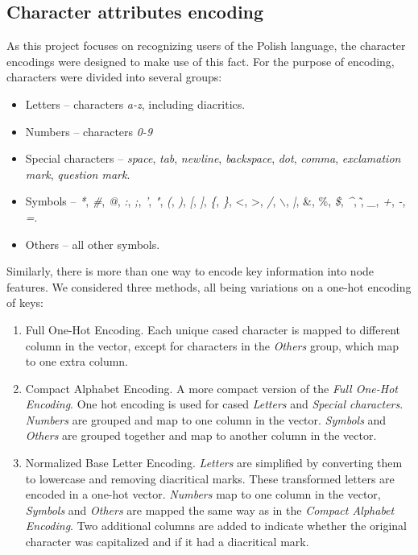 \subsection{Character attributes encoding}
\label{Base_letter_representation}
As this project focuses on recognizing users of the Polish language, the character encodings were designed to make use of this fact. For the purpose of encoding, characters were divided into several groups:\\
\begin{itemize}
	\item Letters -- characters \textit{a-z}, including diacritics.
	\item Numbers -- characters \textit{0-9}
	\item Special characters -- \textit{space}, \textit{tab}, \textit{newline}, \textit{backspace}, \textit{dot}, \textit{comma}, \textit{exclamation mark}, \textit{question mark}.
	\item Symbols -- \textit{*}, \textit{\#}, \textit{@}, \textit{:}, \textit{;},   \textit{'}, \textit{"}, \textit{(}, \textit{)}, \textit{[}, \textit{]}, \textit{\{}, \textit{\}}, \textless, \textgreater, \textit{/}, \textit{$\backslash$}, \textit{|}, \&, \%, \textit{\$}, \textit{\^}, \~, \textit{\_}, \textit{+}, \textit{-}, \textit{=}. 
	\item Others -- all other symbols.
\end{itemize}
Similarly, there is more than one way to encode key information into node features.
We considered three methods, all being variations on a one-hot encoding of keys:
\begin{enumerate}
	\item Full One-Hot Encoding. Each unique cased character is mapped to different column in the vector, except for characters in the \textit{Others} group, which map to one extra column.\\
	\item Compact Alphabet Encoding. A more compact version of the \textit{Full One-Hot Encoding}. One hot encoding is used for cased \textit{Letters} and \textit{Special characters}. \textit{Numbers} are grouped and map to one column in the vector.
	\textit{Symbols} and \textit{Others} are grouped together and map to another column in the vector.\\
	\item Normalized Base Letter Encoding. \textit{Letters} are simplified by converting them to lowercase and removing diacritical marks. These transformed letters are encoded in a one-hot vector. \textit{Numbers} map to one column in the vector, \textit{Symbols} and \textit{Others} are mapped the same way as in the \textit{Compact Alphabet Encoding}. Two additional columns are added to indicate whether the original character was capitalized and if it had a diacritical mark.
\end{enumerate}



